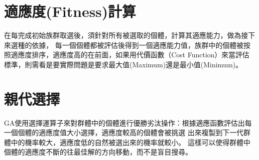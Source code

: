 \section{適應度(Fitness)計算}

在每完成初始族群取選後，須針對所有被選取的個體，計算其適應能力，做為接下來選種的依據， 每一個個體都被評估後得到一個適應能力值，族群中的個體被按照適應度排序，適應度高的在前面，如果用代價函數（Cost Function）來當評估標準，則需看是要實際問題是要求最大值(Maximum)還是最小值(Minimum)。
\section{親代選擇}
GA使用選擇運算子來對群體中的個體進行優勝劣汰操作：根據適應函數評估出每一個個體的適應度值大小選擇，適應度較高的個體會被挑選 出來複製到下一代群體中的機率較大，適應度低的自然被選出來的機率就較小。 這樣可以使得群體中個體的適應度不斷的往最佳解的方向移動，而不是盲目搜尋。

